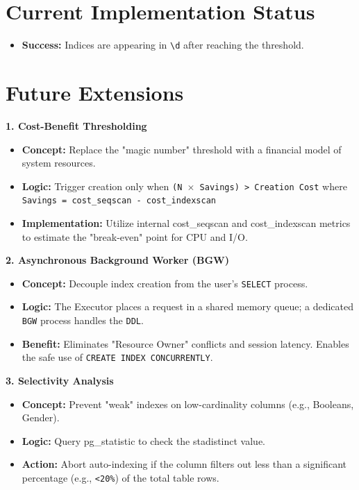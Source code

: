 \documentclass[12pt]{article}
\begin{document}
\section*{Current Implementation Status}

\begin{itemize}[leftmargin=*]
\item \textbf{Success:} Indices are appearing in \texttt{\textbackslash d} after reaching the threshold.
\end{itemize}

\section*{Future Extensions}

\textbf{1. Cost-Benefit Thresholding}

\begin{itemize}
    \item \textbf{Concept:} Replace the "magic number" threshold with a financial model of system resources.

    \item \textbf{Logic:} Trigger creation only when
    \texttt{(N $\times$ Savings) > Creation Cost} where \texttt{Savings = cost\_seqscan - cost\_indexscan}

    \item \textbf{Implementation:} Utilize internal cost\_seqscan and cost\_indexscan metrics to estimate the "break-even" point for CPU and I/O.
\end{itemize}

\noindent\textbf{2. Asynchronous Background Worker (BGW)}

\begin{itemize}
    \item \textbf{Concept:} Decouple index creation from the user's \texttt{SELECT} process.

    \item \textbf{Logic:} The Executor places a request in a shared memory queue; a dedicated \texttt{BGW} process handles the \texttt{DDL}.

    \item \textbf{Benefit:} Eliminates "Resource Owner" conflicts and session latency. Enables the safe use of \texttt{CREATE INDEX CONCURRENTLY}.
\end{itemize}

\noindent\textbf{3. Selectivity Analysis}

\begin{itemize}
    \item \textbf{Concept:} Prevent "weak" indexes on low-cardinality columns (e.g., Booleans, Gender).

    \item \textbf{Logic:} Query pg\_statistic to check the stadistinct value.

    \item \textbf{Action:} Abort auto-indexing if the column filters out less than a significant percentage (e.g., \texttt{<20\%}) of the total table rows.
\end{itemize}
\end{document}
